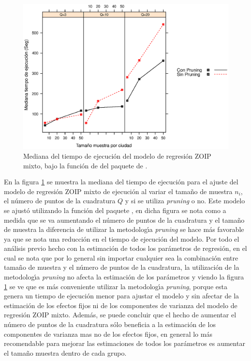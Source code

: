 \begin{figure}
	\begin{center}
		\includegraphics[scale=0.6]{time_mix_ZOIP.eps}	
		\caption{Mediana del tiempo de ejecuci\'{o}n del modelo de regresi\'{o}n ZOIP mixto, bajo la funci\'{o}n de  del paquete  de .}
		\label{time_mix_ZOIP}
	\end{center}
\end{figure}

En la figura \ref{time_mix_ZOIP} se muestra la mediana del tiempo de ejecuci\'{o}n para el ajuste del modelo de regresi\'{o}n ZOIP mixto de ejecuci\'{o}n al variar el tama\~{n}o de muestra $n_i$, el n\'{u}mero de puntos de la cuadratura $Q$ y si se utiliza \textit{pruning} o no. Este modelo se ajust\'{o} utilizando la funci\'{o}n  del paquete , en dicha figura se nota como a medida que se va aumentando el n\'{u}mero de puntos de la cuadratura y el tama\~{n}o de muestra la diferencia de utilizar la metodolog\'{\i}a \textit{pruning} se hace m\'{a}s favorable ya que se nota una reducci\'{o}n en el tiempo de ejecuci\'{o}n del modelo. Por todo el an\'{a}lisis previo hecho con la estimaci\'{o}n de todos los par\'{a}metros de regresi\'{o}n, en el cual se nota que por lo general sin importar cualquier sea la combinaci\'{o}n entre tama\~{n}o de muestra y el n\'{u}mero de puntos de la cuadratura, la utilizaci\'{o}n de la metodolog\'{\i}a \textit{pruning} no afecta la estimaci\'{o}n de los par\'{a}metros y viendo la figura \ref{time_mix_ZOIP} se ve que es m\'{a}s conveniente utilizar la metodolog\'{\i}a \textit{pruning}, porque esta genera un tiempo de ejecuci\'{o}n menor para ajustar el modelo y sin afectar de la estimaci\'{o}n de los efectos fijos ni de los componentes de varianza del modelo de regresi\'{o}n ZOIP mixto. Adem\'{a}s, se puede concluir que el hecho de aumentar el n\'{u}mero de puntos de la cuadratura s\'{o}lo beneficia a la estimaci\'{o}n de los componentes de varianza mas no de los efectos fijos, en general lo m\'{a}s recomendable para mejorar las estimaciones de todos los par\'{a}metros es aumentar el tama\~{n}o muestra dentro de cada grupo.


